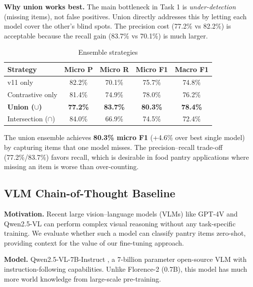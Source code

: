 \documentclass[11pt]{article}
\begin{document}
\textbf{Why union works best.} The main bottleneck in Task 1 is \textit{under-detection} (missing items), not false positives. Union directly addresses this by letting each model cover the other's blind spots. The precision cost (77.2\% vs 82.2\%) is acceptable because the recall gain (83.7\% vs 70.1\%) is much larger.

\begin{table}[h]
\centering
\caption{Ensemble strategies}
\label{tab:ensemble}
\begin{tabular}{lcccc}
\toprule
Strategy & Micro P & Micro R & Micro F1 & Macro F1 \\
\midrule
v11 only & 82.2\% & 70.1\% & 75.7\% & 74.8\% \\
Contrastive only & 81.4\% & 74.9\% & 78.0\% & 76.2\% \\
\textbf{Union ($\cup$)} & \textbf{77.2\%} & \textbf{83.7\%} & \textbf{80.3\%} & \textbf{78.4\%} \\
Intersection ($\cap$) & 84.0\% & 66.9\% & 74.5\% & 72.4\% \\
\bottomrule
\end{tabular}
\end{table}

The union ensemble achieves \textbf{80.3\% micro F1} (+4.6\% over best single model) by capturing items that one model misses. The precision--recall trade-off (77.2\%/83.7\%) favors recall, which is desirable in food pantry applications where missing an item is worse than over-counting.

\subsection{VLM Chain-of-Thought Baseline}

\textbf{Motivation.} Recent large vision--language models (VLMs) like GPT-4V and Qwen2.5-VL can perform complex visual reasoning without any task-specific training. We evaluate whether such a model can classify pantry items zero-shot, providing context for the value of our fine-tuning approach.

\textbf{Model.} Qwen2.5-VL-7B-Instruct \cite{qwen2vl}, a 7-billion parameter open-source VLM with instruction-following capabilities. Unlike Florence-2 (0.7B), this model has much more world knowledge from large-scale pre-training.
\end{document}
